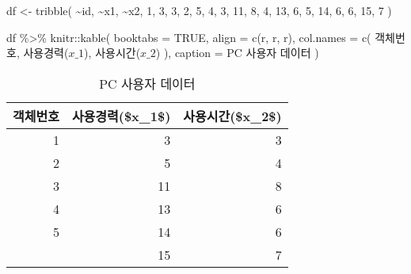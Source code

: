 \documentclass[
]{book}
\newenvironment{Shaded}{\begin{snugshade}}{\end{snugshade}}
\newcommand{\AttributeTok}[1]{\textcolor[rgb]{0.77,0.63,0.00}{#1}}
\newcommand{\ConstantTok}[1]{\textcolor[rgb]{0.00,0.00,0.00}{#1}}
\newcommand{\DecValTok}[1]{\textcolor[rgb]{0.00,0.00,0.81}{#1}}
\newcommand{\FunctionTok}[1]{\textcolor[rgb]{0.00,0.00,0.00}{#1}}
\newcommand{\NormalTok}[1]{#1}
\newcommand{\OtherTok}[1]{\textcolor[rgb]{0.56,0.35,0.01}{#1}}
\newcommand{\SpecialCharTok}[1]{\textcolor[rgb]{0.00,0.00,0.00}{#1}}
\newcommand{\StringTok}[1]{\textcolor[rgb]{0.31,0.60,0.02}{#1}}
\begin{document}
\begin{Shaded}
\begin{Highlighting}[]
\NormalTok{df }\OtherTok{\textless{}{-}} \FunctionTok{tribble}\NormalTok{(}
  \SpecialCharTok{\textasciitilde{}}\NormalTok{id, }\SpecialCharTok{\textasciitilde{}}\NormalTok{x1, }\SpecialCharTok{\textasciitilde{}}\NormalTok{x2,}
  \DecValTok{1}\NormalTok{, }\DecValTok{3}\NormalTok{, }\DecValTok{3}\NormalTok{,}
  \DecValTok{2}\NormalTok{, }\DecValTok{5}\NormalTok{, }\DecValTok{4}\NormalTok{,}
  \DecValTok{3}\NormalTok{, }\DecValTok{11}\NormalTok{, }\DecValTok{8}\NormalTok{,}
  \DecValTok{4}\NormalTok{, }\DecValTok{13}\NormalTok{, }\DecValTok{6}\NormalTok{,}
  \DecValTok{5}\NormalTok{, }\DecValTok{14}\NormalTok{, }\DecValTok{6}\NormalTok{,}
  \DecValTok{6}\NormalTok{, }\DecValTok{15}\NormalTok{, }\DecValTok{7}
\NormalTok{)}

\NormalTok{df }\SpecialCharTok{\%\textgreater{}\%}
\NormalTok{  knitr}\SpecialCharTok{::}\FunctionTok{kable}\NormalTok{(}
    \AttributeTok{booktabs =} \ConstantTok{TRUE}\NormalTok{,}
    \AttributeTok{align =} \FunctionTok{c}\NormalTok{(}\StringTok{\textquotesingle{}r\textquotesingle{}}\NormalTok{, }\StringTok{\textquotesingle{}r\textquotesingle{}}\NormalTok{, }\StringTok{\textquotesingle{}r\textquotesingle{}}\NormalTok{),}
    \AttributeTok{col.names =} \FunctionTok{c}\NormalTok{(}
      \StringTok{\textquotesingle{}객체번호\textquotesingle{}}\NormalTok{, }
      \StringTok{\textquotesingle{}사용경력($x\_1$)\textquotesingle{}}\NormalTok{, }\StringTok{\textquotesingle{}사용시간($x\_2$)\textquotesingle{}}
\NormalTok{      ),}
    \AttributeTok{caption =} \StringTok{\textquotesingle{}PC 사용자 데이터\textquotesingle{}}
\NormalTok{  )}
\end{Highlighting}
\end{Shaded}

\begin{table}

\caption{\label{tab:pam-train-data}PC 사용자 데이터}
\centering
\begin{tabular}[t]{rrr}
\toprule
객체번호 & 사용경력(\$x\_1\$) & 사용시간(\$x\_2\$)\\
\midrule
1 & 3 & 3\\
2 & 5 & 4\\
3 & 11 & 8\\
4 & 13 & 6\\
5 & 14 & 6\\
\addlinespace
6 & 15 & 7\\
\bottomrule
\end{tabular}
\end{table}
\end{document}
